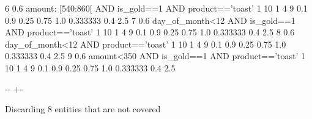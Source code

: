 \documentclass[letterpaper,10pt,english]{sphinxmanual}
\newlength\nbsphinxcodecellspacing
\begin{document}
{\begin{sphinxVerbatim}[commandchars=\\\{\}]
6      0.6           amount: [540:860[ AND is\_gold==1 AND product=='toast'        1            10             1                  4                9               0.1                       0.9         0.25                 0.75              1.0                 0.333333                   0.4   2.5
7      0.6             day\_of\_month<12 AND is\_gold==1 AND product=='toast'        1            10             1                  4                9               0.1                       0.9         0.25                 0.75              1.0                 0.333333                   0.4   2.5
8      0.6                            day\_of\_month<12 AND product=='toast'        1            10             1                  4                9               0.1                       0.9         0.25                 0.75              1.0                 0.333333                   0.4   2.5
9      0.6                  amount<350 AND is\_gold==1 AND product=='toast'        1            10             1                  4                9               0.1                       0.9         0.25                 0.75              1.0                 0.333333                   0.4   2.5
\end{sphinxVerbatim}
}

{
\begin{sphinxVerbatim}[commandchars=\\\{\}]
\llap{\color{nbsphinxin}[6]:\,\hspace{\fboxrule}\hspace{\fboxsep}}
   
\end{sphinxVerbatim}
}

{

\kern-\sphinxverbatimsmallskipamount\kern-\baselineskip
\kern+\FrameHeightAdjust\kern-\fboxrule
\vspace{\nbsphinxcodecellspacing}

\begin{sphinxVerbatim}[commandchars=\\\{\}]
Discarding 8 entities that are not covered
\end{sphinxVerbatim}
}
\end{document}
